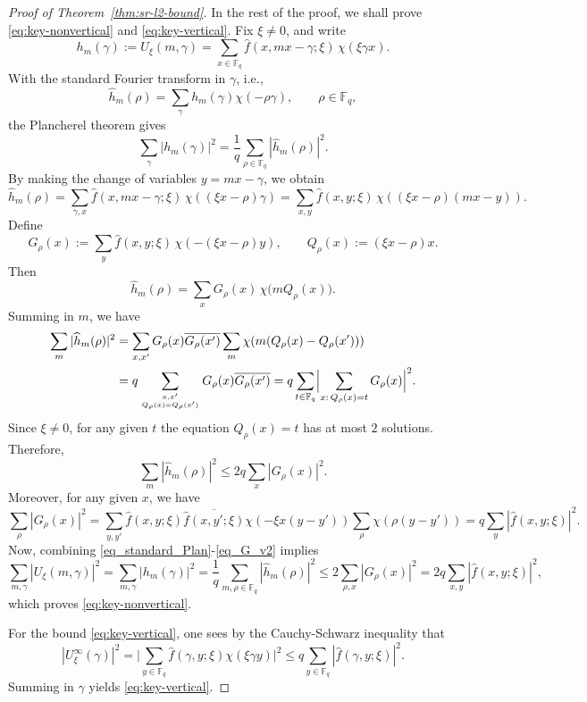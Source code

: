 \documentclass[11pt]{article}
\newcommand{\F}{\mathbb{F}}
\newcommand{\1}{\mathbf 1}
\newcommand{\Fq}{\mathbb{F}_q}
\begin{document}
\begin{proof}[Proof of Theorem~\ref{thm:sr-l2-bound}]
In the rest of the proof, we shall prove \eqref{eq:key-nonvertical} and \eqref{eq:key-vertical}. Fix $\xi\neq 0$, and write
\[
h_m(\gamma):=U_\xi(m,\gamma)=\sum_{x\in\mathbb F_q}
\widehat f(x,mx-\gamma;\xi)\,\chi(\xi\gamma x).
\]
With the standard Fourier transform in $\gamma$, i.e., 
\[
\widehat h_m(\rho)
=
\sum_{\gamma} h_m(\gamma)\chi(-\rho \gamma), \qquad \rho\in \Fq,
\]
the Plancherel theorem gives
\begin{equation} \label{eq_standard_Plan}
\sum_{\gamma}|h_m(\gamma)|^2
=
\frac1q\sum_{\rho\in\mathbb F_q}|\widehat h_m(\rho)|^2.
\end{equation}
By making the change of variables $y=mx-\gamma$, we obtain
\[
\widehat h_m(\rho)
=
\sum_{\gamma,x}
\widehat f(x,mx-\gamma;\xi)\,
\chi\!\left((\xi x-\rho)\gamma \right)
=
\sum_{x,y}
\widehat f(x,y;\xi)\,
\chi\!\left((\xi x-\rho)(mx-y)\right).
\]
Define
\[
G_\rho(x):=\sum_{y}\widehat f(x,y;\xi)\,
\chi\!\left(-(\xi x-\rho)y\right),
\qquad
Q_\rho(x):=(\xi x-\rho)x.
\]
Then
\[
\widehat h_m(\rho)
=
\sum_{x} G_\rho(x)\,\chi\!\bigl(mQ_\rho(x)\bigr).
\]
Summing in $m$, we have
\begin{align}
\sum_{m}|\widehat h_m(\rho)|^2
&= \sum\limits_{x,x'}G_\rho(x)\overline{G_\rho(x')}\sum\limits_{m} \chi(m(Q_\rho(x)-Q_\rho(x'))) \nonumber\\
&= q\sum\limits_{x,x' \atop Q_\rho(x)=Q_\rho(x')}G_\rho(x)\overline{G_\rho(x')} =
q\sum_{t\in\mathbb F_q}
\Bigl|\sum_{x:\, Q_\rho(x)=t} G_\rho(x)\Bigr|^2. \nonumber 
\end{align}
Since $\xi\neq 0$, for any given $t$ the equation $Q_\rho(x)=t$ has at most $2$ solutions. 
Therefore,
\begin{equation} \label{eq_restrict}
\sum_{m}|\widehat h_m(\rho)|^2
\le
2q\sum_{x}|G_\rho(x)|^2.
\end{equation}
Moreover, for any given $x$, we have 
\begin{equation} \label{eq_G_v2}
\sum\limits_{\rho}|G_\rho(x)|^2 = \sum\limits_{y,y'}\widehat{f}(x,y;\xi)\overline{\widehat{f}(x,y';\xi)}\chi(-\xi x(y-y'))\sum\limits_{\rho}\chi(\rho(y-y')) = q \sum\limits_{y} |\widehat{f}(x,y;\xi)|^2.
\end{equation}
Now, combining \eqref{eq_standard_Plan}-\eqref{eq_G_v2} implies
\[
\sum_{m,\gamma}|U_\xi(m,\gamma)|^2=\sum_{m,\gamma}|h_m(\gamma)|^2
=
\frac1q\sum_{m, \rho\in\mathbb F_q}|\widehat h_m(\rho)|^2\leq 2 \sum\limits_{\rho,x}|G_\rho(x)|^2 =
2q\sum_{x,y}|\widehat f(x,y;\xi)|^2,
\]
which proves \eqref{eq:key-nonvertical}.

For the bound \eqref{eq:key-vertical}, one sees by the Cauchy-Schwarz inequality that 
\[
|U_\xi^\infty(\gamma)|^2=\Big|\sum\limits_{y\in \F_q}\widehat{f}(\gamma,y;\xi)\chi(\xi\gamma y)\Big|^2\leq q\sum\limits_{y\in \F_q}|\widehat{f}(\gamma,y;\xi)|^2.
\]
Summing in $\gamma$ yields \eqref{eq:key-vertical}. 
\end{proof}
\end{document}
